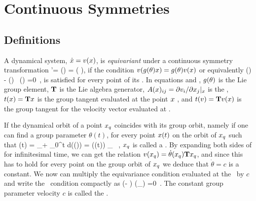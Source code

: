 \section{Continuous Symmetries}
\label{s:symm}

\subsection{Definitions}

A dynamical system, $\dot{x}=v(x)$, is \emph{equivariant} under a continuous
symmetry transformation
\beq
	\ssp'= \LieEl (\theta) \ssp = \exp\left( \theta \Lg\right)\ssp,
if the condition
$v(g (\theta) x ) = g (\theta) v( x ) $
or equivalently 
\beq
  \groupTan(\vel)  - \Mvar(\ssp) \, \groupTan(\ssp) =0
  \,,
is satisfied for every point of its \statesp . In equations 
and , $g (\theta)$ is the Lie group element, $\mathbf{T}$
is the Lie algebra generator, $A(x)_{ij} = {\partial v_i}/{\partial x_j} |_x$
is the \stabmat , $ t(x) = \mathbf{T} x $ is the group tangent evaluated
at the point $x$ , and $ t(v) = \mathbf{T} v(x) $ is the group
tangent for the velocity vector evaluated at \ssp. 

\label{s:relatives}

If the dynamical orbit of a point $x_q$ coincides with its group
orbit, namely if one can find a group parameter $\theta (t)$, for every point $x (t)$
on the orbit of $x_q$ such that
\beq
  \ssp (t) = \ssp_\stagn + \int_0^t d\tau \vel(\ssp (\tau)) = \LieEl (\theta (t)) \ssp_\stagn
  \, ,
 $x_q$ is called a \emph{ \reqv }. By expanding both sides of 
for infinitesimal time, we can get the relation
$v(x_q) = \dot{\theta}(x_q) \mathbf{T} x_q$,
and since this has to hold for every point on the group orbit of $x_q$
we deduce that $\dot{\theta} = c$ is a constant. We now can multiply the equivariance
condition  evaluated at the \reqv\ by $c$ and write the
\reqv\ condition compactly as
\beq
(\velRel \Lg - \Mvar ) \vel (\ssp_\stagn) =0
\,.
The constant group parameter velocity $c$  is called the \phaseVel .

